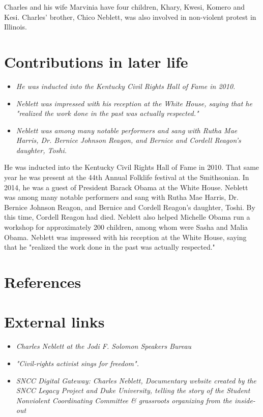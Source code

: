 Charles and his wife Marvinia have four children, Khary, Kwesi, Komero
and Kesi. Charles' brother, Chico Neblett, was also involved in
non-violent protest in Illinois.

\section{Contributions in later life}\label{contributions-in-later-life}

\begin{itemize}
\item
  \emph{He was inducted into the Kentucky Civil Rights Hall of Fame in
  2010.}
\item
  \emph{Neblett was impressed with his reception at the White House,
  saying that he "realized the work done in the past was actually
  respected."}
\item
  \emph{Neblett was among many notable performers and sang with Rutha
  Mae Harris, Dr. Bernice Johnson Reagon, and Bernice and Cordell
  Reagon's daughter, Toshi.}
\end{itemize}

He was inducted into the Kentucky Civil Rights Hall of Fame in 2010.
That same year he was present at the 44th Annual Folklife festival at
the Smithsonian. In 2014, he was a guest of President Barack Obama at
the White House. Neblett was among many notable performers and sang with
Rutha Mae Harris, Dr. Bernice Johnson Reagon, and Bernice and Cordell
Reagon's daughter, Toshi. By this time, Cordell Reagon had died. Neblett
also helped Michelle Obama run a workshop for approximately 200
children, among whom were Sasha and Malia Obama. Neblett was impressed
with his reception at the White House, saying that he "realized the work
done in the past was actually respected."

\section{References}\label{references}

\section{External links}\label{external-links}

\begin{itemize}
\item
  \emph{Charles Neblett at the Jodi F. Solomon Speakers Bureau}
\item
  \emph{"Civil-rights activist sings for freedom".}
\item
  \emph{SNCC Digital Gateway: Charles Neblett, Documentary website
  created by the SNCC Legacy Project and Duke University, telling the
  story of the Student Nonviolent Coordinating Committee \& grassroots
  organizing from the inside-out}
\end{itemize}

